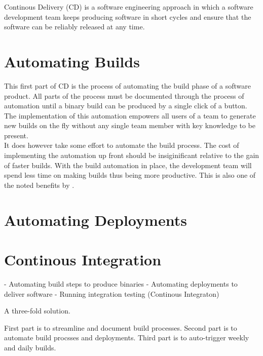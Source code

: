 \documentclass{ituthesis}
\begin{document}
Continous Delivery (CD) is a software engineering approach in which a software development team keeps producing software in short cycles and ensure that the software can be reliably released at any time. 


\section{Automating Builds}

This first part of CD is the process of automating the build phase of a software product. All parts of the process must be documented through the process of automation \cite{Osterweil1997} until a binary build can be produced by a single click of a button. The implementation of this automation empowers all users of a team to generate new builds on the fly without any single team member with key knowledge to be present.\\

It does however take some effort to automate the build process. The cost of implementing the automation up front should be insiginificant relative to the gain of faster builds. With the build automation in place, the development team will spend less time on making builds thus being more productive. This is also one of the noted benefits by \cite{Chen2015}.

\section{Automating Deployments}

\section{Continous Integration}

- Automating build steps to produce binaries
- Automating deployments to deliver software
- Running integration testing (Continous Integraton)

A three-fold solution.

First part is to streamline and document build processes.
Second part is to automate build procsses and deployments.
Third part is to auto-trigger weekly and daily builds.
\end{document}
